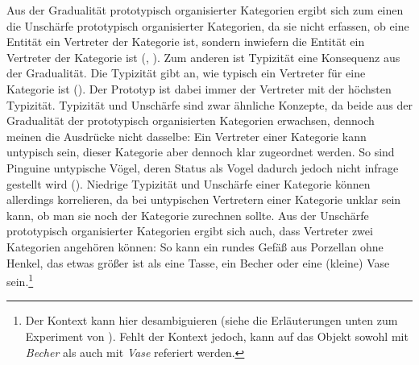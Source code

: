 Aus der Gradualität prototypisch organisierter Kategorien ergibt sich zum einen die Unschärfe prototypisch organisierter Kategorien, da sie nicht erfassen, ob eine Entität ein Vertreter der Kategorie ist, sondern inwiefern die Entität ein Vertreter der Kategorie ist (\cite[106]{Kleiber.1993}, \cite[33]{Schmid.2000}). Zum anderen ist Typizität eine Konsequenz aus der Gradualität. Die Typizität gibt an, wie typisch ein Vertreter für eine Kategorie ist (\cite[33]{Schmid.2000}). Der Prototyp ist dabei immer der Vertreter mit der höchsten Typizität. Typizität und Unschärfe sind zwar ähnliche Konzepte, da beide aus der Gradualität der prototypisch organisierten Kategorien erwachsen, dennoch meinen die Ausdrücke nicht dasselbe: Ein Vertreter einer Kategorie kann untypisch sein, dieser Kategorie aber dennoch klar zugeordnet werden. So sind Pinguine untypische Vögel, deren Status als Vogel dadurch jedoch nicht infrage gestellt wird (\cite[563]{Taylor.2015}). Niedrige Typizität und Unschärfe einer Kategorie können allerdings korrelieren, da bei untypischen Vertretern einer Kategorie unklar sein kann, ob man sie noch der Kategorie zurechnen sollte. Aus der Unschärfe prototypisch organisierter Kategorien ergibt sich auch, dass Vertreter zwei Kategorien angehören können: So kann ein rundes Gefäß aus Porzellan ohne Henkel, das etwas größer ist als eine Tasse, ein Becher oder eine (kleine) Vase sein.\footnote{Der Kontext kann hier desambiguieren (siehe die Erläuterungen unten zum Experiment von \cite{Labov.2004}). Fehlt der Kontext jedoch, kann auf das Objekt sowohl mit \textit{Becher} als auch mit \textit{Vase} referiert werden.}

